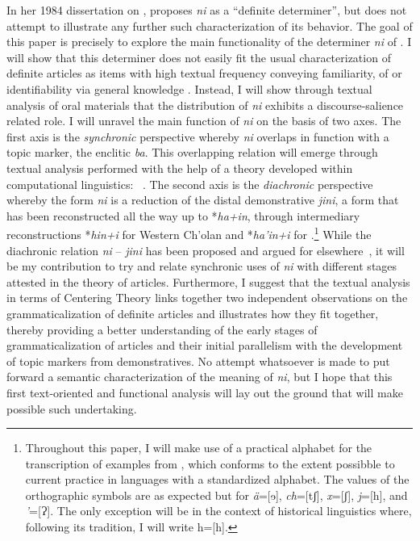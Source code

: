 \documentclass[output=paper
,modfonts
,nonflat]{langsci/langscibook}
\begin{document}
In her 1984 dissertation on  ,  \cite[209]{Knowles1984} proposes \textit{ni} as a ``definite determiner'', but does not attempt to illustrate any further such characterization of its behavior. The goal of this paper is precisely to explore the main functionality of the determiner \textit{ni} of . I will show that this determiner does not easily fit the usual characterization of definite articles as items with high textual frequency conveying familiarity,  of  or identifiability via general knowledge \citep[832]{Himmelmann2001}. Instead, I will show through textual analysis of oral materials that the distribution of \textit{ni} exhibits a discourse-salience related role. I will unravel the main function of \textit{ni} on the basis of two axes. The first axis is the \textit{synchronic} perspective whereby \textit{ni} overlaps in function with a topic marker, the enclitic \textit{ba}. This overlapping relation will emerge through textual analysis performed with the help of a theory developed within computational linguistics: ~\citep{GroszEtAlii1995}. The second axis is the \textit{diachronic} perspective whereby the form \textit{ni} is a reduction of the distal demonstrative \textit{jini}, a form that has been reconstructed all the way up to  *\textit{ha+in}, through intermediary reconstructions *\textit{hin+i} for Western Ch'olan and *\textit{ha'in+i} for .\footnote{Throughout this paper, I will make use of a practical alphabet for the transcription of examples from , which conforms to the extent possibble to current practice in  languages with a standardized alphabet. The values of the orthographic symbols are as expected but for \textit{ä}=[ɘ], \textit{ch}=[tʃ], \textit{x}=[ʃ], \textit{j}=[h], and \textit{’}=[Ɂ].  The only exception will be in the context of  historical linguistics where, following its tradition, I will write h=[h].} While the diachronic relation \textit{ni} -- \textit{jini} has been proposed and argued for elsewhere~\citep{Mora-Marin2009}, it will be my contribution to try and relate synchronic uses of \textit{ni} with different stages attested in the  theory of articles. Furthermore, I suggest that the textual analysis in terms of Centering Theory links together two independent observations on the grammaticalization of definite articles and illustrates how they fit together, thereby providing a better understanding of the early stages of grammaticalization of articles and their initial parallelism with the development of topic markers from demonstratives. No attempt whatsoever is made to put forward a semantic characterization of the meaning of \textit{ni}, but I hope that this first text-oriented and functional analysis will lay out the ground that will make possible such undertaking.\largerpage[1]
\end{document}
